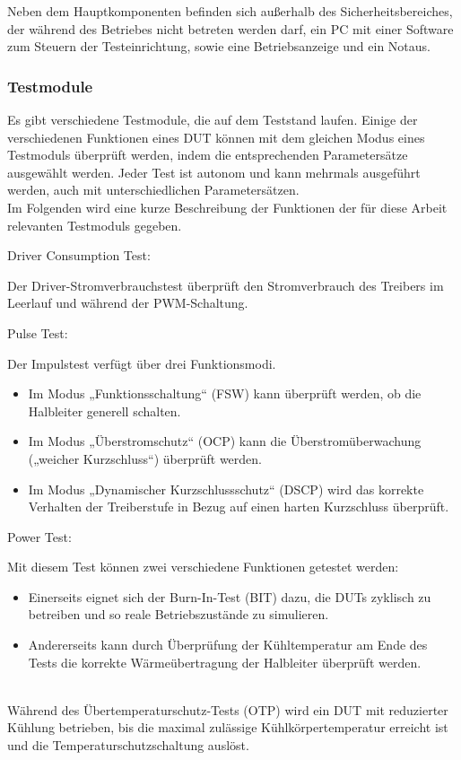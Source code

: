 Neben dem Hauptkomponenten befinden sich außerhalb des Sicherheitsbereiches, der während des Betriebes nicht betreten werden darf,
ein PC mit einer Software zum Steuern der Testeinrichtung, sowie eine Betriebsanzeige und ein Notaus. \cite*{Main_Manuel_USTB2018}
\color{red}
\subsubsection{Testmodule}

Es gibt verschiedene Testmodule, die auf dem Teststand laufen.
Einige der verschiedenen Funktionen eines DUT können mit dem gleichen Modus eines Testmoduls überprüft werden, indem die entsprechenden Parametersätze ausgewählt werden.
Jeder Test ist autonom und kann mehrmals ausgeführt werden, auch mit unterschiedlichen Parametersätzen.
\\
Im Folgenden wird eine kurze Beschreibung der Funktionen der für diese Arbeit relevanten Testmoduls gegeben.

Driver Consumption Test:

Der Driver-Stromverbrauchstest überprüft den Stromverbrauch des Treibers im Leerlauf und während der PWM-Schaltung.

Pulse Test:

Der Impulstest verfügt über drei Funktionsmodi.
\begin{itemize}
    \item Im Modus „Funktionsschaltung“ (FSW) kann überprüft werden, ob die Halbleiter generell schalten.
    \item Im Modus „Überstromschutz“ (OCP) kann die Überstromüberwachung („weicher Kurzschluss“) überprüft werden.
    \item Im Modus „Dynamischer Kurzschlussschutz“ (DSCP) wird das korrekte Verhalten der Treiberstufe in Bezug auf einen harten Kurzschluss überprüft.
\end{itemize}

Power Test:

Mit diesem Test können zwei verschiedene Funktionen getestet werden:
\begin{itemize}
    \item Einerseits eignet sich der Burn-In-Test (BIT) dazu, die DUTs zyklisch zu betreiben und so reale Betriebszustände zu simulieren.
    \item Andererseits kann durch Überprüfung der Kühltemperatur am Ende des Tests die korrekte Wärmeübertragung der Halbleiter überprüft werden.
\end{itemize}
\\
Während des Übertemperaturschutz-Tests (OTP) wird ein DUT mit reduzierter Kühlung betrieben, bis die maximal zulässige
Kühlkörpertemperatur erreicht ist und die Temperaturschutzschaltung auslöst.

